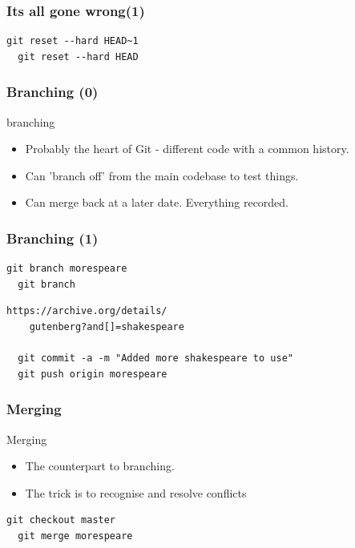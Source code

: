 \documentclass{beamer}
\begin{document}
\begin{frame}[fragile]
  \frametitle{Its all gone wrong(1)}
  
  \begin{lstlisting}[caption=restoring things] 
  git reset --hard HEAD~1
  git reset --hard HEAD
  \end{lstlisting}

\end{frame}


\begin{frame}[fragile]
  \frametitle{Branching (0)}

  \begin{block}{branching}
   \begin{itemize}  
      \item Probably the heart of Git - different code with a common history.
      \item Can 'branch off' from the main codebase to test things.
      \item Can merge back at a later date. Everything recorded.
    \end{itemize}
  \end{block}


\end{frame}

\begin{frame}[fragile]
  \frametitle{Branching (1)}

  \begin{lstlisting}[caption=branching] 
  git branch morespeare
  git branch
  \end{lstlisting}

  \begin{lstlisting}[caption=make some changes] 
  https://archive.org/details/
    gutenberg?and[]=shakespeare
  
  git commit -a -m "Added more shakespeare to use"
  git push origin morespeare
  \end{lstlisting}


\end{frame}

\begin{frame}[fragile]
  \frametitle{Merging}

  \begin{block}{Merging}
   \begin{itemize}  
      \item The counterpart to branching.
      \item The trick is to recognise and resolve conflicts
    \end{itemize}
  \end{block}

  \begin{lstlisting}[caption=make some changes] 
  git checkout master 
  git merge morespeare
  \end{lstlisting}

\end{frame}
\end{document}
